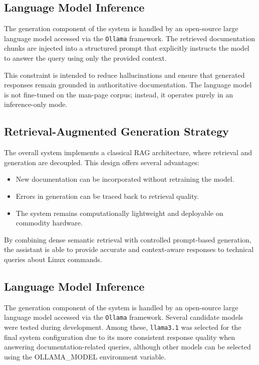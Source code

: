 \documentclass[conference]{IEEEtran}
\begin{document}
\subsection{Language Model Inference}

The generation component of the system is handled by an open-source large language model accessed via the \texttt{Ollama} framework. The retrieved documentation chunks are injected into a structured prompt that explicitly instructs the model to answer the query using only the provided context.

This constraint is intended to reduce hallucinations and ensure that generated responses remain grounded in authoritative documentation. The language model is not fine-tuned on the man-page corpus; instead, it operates purely in an inference-only mode.

\subsection{Retrieval-Augmented Generation Strategy}

The overall system implements a classical RAG architecture, where retrieval and generation are decoupled. This design offers several advantages:
\begin{itemize}
    \item New documentation can be incorporated without retraining the model.
    \item Errors in generation can be traced back to retrieval quality.
    \item The system remains computationally lightweight and deployable on commodity hardware.
\end{itemize}

By combining dense semantic retrieval with controlled prompt-based generation, the assistant is able to provide accurate and context-aware responses to technical queries about Linux commands.

\subsection{Language Model Inference}

The generation component of the system is handled by an open-source large language model accessed via the \texttt{Ollama} framework. Several candidate models were tested during development. Among these, \texttt{llama3.1} was selected for the final system configuration due to its more consistent response quality when answering documentation-related queries, although other models can be selected using the OLLAMA\_MODEL environment variable.
\end{document}
